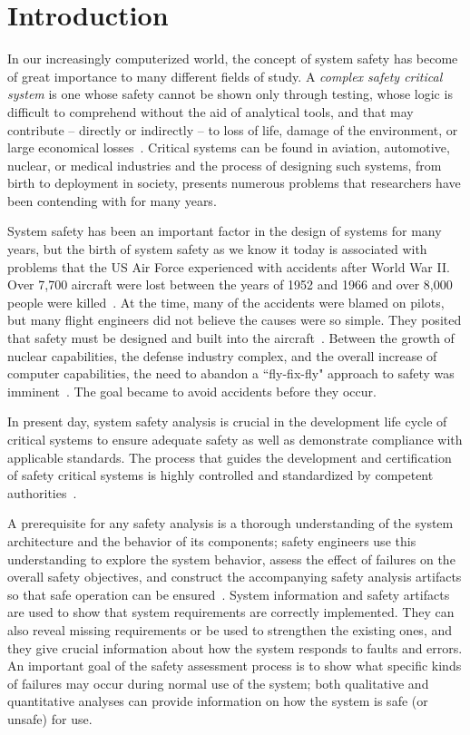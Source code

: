 \chapter{Introduction}
\label{chap:intro}
In our increasingly computerized world, the concept of system safety has become of great importance to many different fields of study. A \emph{complex safety critical system} is one whose safety cannot be shown only through testing, whose logic is difficult to comprehend without the aid of analytical tools, and that may contribute -- directly or indirectly -- to loss of life, damage of the environment, or large economical losses~\cite{SAE}. Critical systems can be found in aviation, automotive, nuclear, or medical industries and the process of designing such systems, from birth to deployment in society, presents numerous problems that researchers have been contending with for many years. 

System safety has been an important factor in the design of systems for many years, but the birth of system safety as we know it today is associated with problems that the US Air Force experienced with accidents after World War II. Over 7,700 aircraft were lost between the years of 1952 and 1966 and over 8,000 people were killed~\cite{hammer}. At the time, many of the accidents were blamed on pilots, but many flight engineers did not believe the causes were so simple. They posited that safety must be designed and built into the aircraft~\cite{levesonWhitePaper}. Between the growth of nuclear capabilities, the defense industry complex, and the overall increase of computer capabilities, the need to abandon a ``fly-fix-fly" approach to safety was imminent~\cite{miller1954applying, levesonWhitePaper, hammer}. The goal became to avoid accidents before they occur. 

In present day, system safety analysis is crucial in the development life cycle of critical systems to ensure adequate safety as well as demonstrate compliance with applicable standards. The process that guides the development and certification of safety critical systems is highly controlled and standardized by competent authorities~\cite{SAE,SAE:ARP4761,SAE:ARP4754A}.

A prerequisite for any safety analysis is a thorough understanding of the system architecture and the behavior of its components; safety engineers use this understanding to explore the system behavior, assess the effect of failures on the overall safety objectives, and construct the accompanying safety analysis artifacts so that safe operation can be ensured~\cite{SAE:ARP4761,SAE:ARP4754A}. System information and safety artifacts are used to show that system requirements are correctly implemented. They can also reveal missing requirements or be used to strengthen the existing ones, and they give crucial information about how the system responds to faults and errors. An important goal of the safety assessment process is to show what specific kinds of failures may occur during normal use of the system; both qualitative and quantitative analyses can provide information on how the system is safe (or unsafe) for use.

